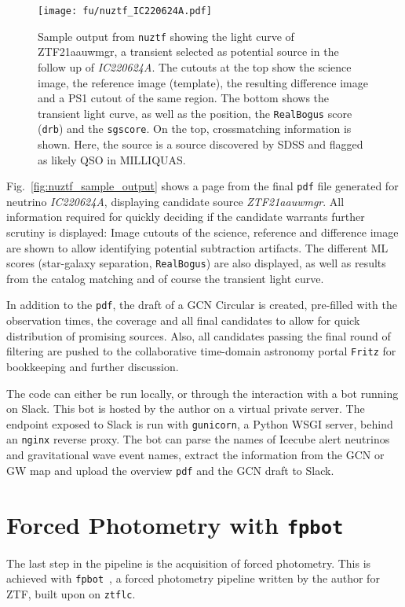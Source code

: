 \begin{figure}[h!]
    \texttt{[image: fu/nuztf\_IC220624A.pdf]}
    \caption[\texttt{nuztf} output]{Sample output from \texttt{nuztf} showing the light curve of ZTF21aauwmgr, a transient selected as potential source in the follow up of \textit{IC220624A}. The cutouts at the top show the science image, the reference image (template), the resulting difference image and a PS1 cutout of the same region. The bottom shows the transient light curve, as well as the position, the \texttt{RealBogus} score (\texttt{drb}) and the \texttt{sgscore}. On the top, crossmatching information is shown. Here, the source is a source discovered by SDSS and flagged as likely QSO in MILLIQUAS.}
\end{figure}

Fig.~\ref{fig:nuztf_sample_output} shows a page from the final \texttt{pdf} file generated for neutrino \textit{IC220624A}, displaying candidate source \textit{ZTF21aauwmgr}. All information required for quickly deciding if the candidate warrants further scrutiny is displayed: Image cutouts of the science, reference and difference image are shown to allow identifying potential subtraction artifacts. The different ML scores (star-galaxy separation, \texttt{RealBogus}) are also displayed, as well as results from the catalog matching and of course the transient light curve.

In addition to the \texttt{pdf}, the draft of a GCN Circular is created, pre-filled with the observation times, the coverage and all final candidates to allow for quick distribution of promising sources. Also, all candidates passing the final round of filtering are pushed to the collaborative time-domain astronomy portal \texttt{Fritz} for bookkeeping and further discussion.

The code can either be run locally, or through the interaction with a bot running on Slack. This bot is hosted by the author on a virtual private server. The endpoint exposed to Slack is run with \texttt{gunicorn}, a Python WSGI server, behind an \texttt{nginx} reverse proxy. The bot can parse the names of Icecube alert neutrinos and gravitational wave event names, extract the information from the GCN or GW map and upload the overview \texttt{pdf} and the GCN draft to Slack.

\section{Forced Photometry with \texttt{fpbot}}\label{fpbot}
The last step in the pipeline is the acquisition of forced photometry. This is achieved with \texttt{fpbot}~, a forced photometry pipeline written by the author for ZTF, built upon on \texttt{ztflc}.

